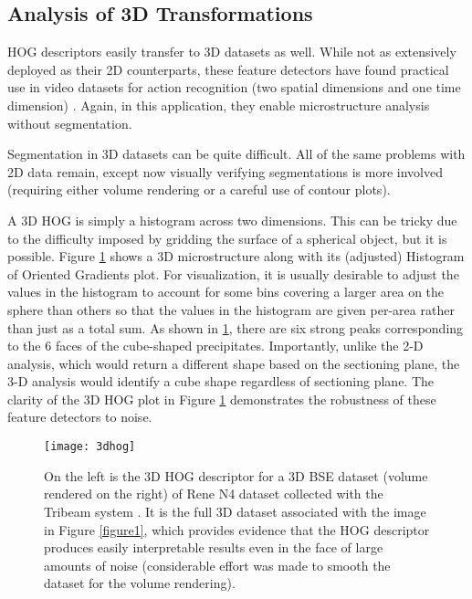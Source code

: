 \documentclass[review]{elsarticle}
\begin{document}
	\subsection{Analysis of 3D Transformations}
	HOG descriptors easily transfer to 3D datasets as well. While not as extensively deployed as their 2D counterparts, these feature detectors have found practical use in video datasets for action recognition (two spatial dimensions and one time dimension) \cite{hog3d1}. Again, in this application, they enable microstructure analysis without segmentation.

	Segmentation in 3D datasets can be quite difficult. All of the same problems with 2D data remain, except now visually verifying segmentations is more involved (requiring either volume rendering or a careful use of contour plots).

	A 3D HOG is simply a histogram across two dimensions. This can be tricky due to the difficulty imposed by gridding the surface of a spherical object, but it is possible. Figure \ref{figure4} shows a 3D microstructure along with its (adjusted) Histogram of Oriented Gradients plot. For visualization, it is usually desirable to adjust the values in the histogram to account for some bins covering a larger area on the sphere than others so that the values in the histogram are given per-area rather than just as a total sum. As shown in \ref{figure4}, there are six strong peaks corresponding to the 6 faces of the cube-shaped precipitates. Importantly, unlike the 2-D analysis, which would return a different shape based on the sectioning plane, the 3-D analysis would identify a cube shape regardless of sectioning plane. The clarity of the 3D HOG plot in Figure \ref{figure4} demonstrates the robustness of these feature detectors to noise.
	
	\begin{figure}[!ht]
  		\centering
    	\texttt{[image: 3dhog]}
  		\caption{ On the left is the 3D HOG descriptor for a 3D BSE dataset (volume rendered on the right) of Rene N4 dataset collected with the Tribeam system \cite{tribeam}. It is the full 3D dataset associated with the image in Figure \ref{figure1}, which provides evidence that the HOG descriptor produces easily interpretable results even in the face of large amounts of noise (considerable effort was made to smooth the dataset for the volume rendering). }
  		\label{figure4}
	\end{figure}
\end{document}
